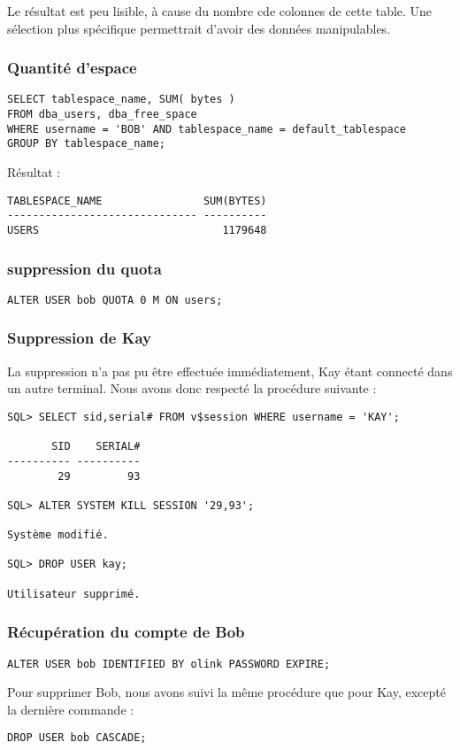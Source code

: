 Le résultat est peu lisible, à cause du nombre cde colonnes de cette table.
Une sélection plus spécifique permettrait d’avoir des données manipulables.

\subsubsection{Quantité d’espace}

\begin{verbatim}
SELECT tablespace_name, SUM( bytes )
FROM dba_users, dba_free_space
WHERE username = 'BOB' AND tablespace_name = default_tablespace
GROUP BY tablespace_name;
\end{verbatim}

Résultat :
\begin{verbatim}
TABLESPACE_NAME                SUM(BYTES)                                       
------------------------------ ----------                                       
USERS                             1179648 
\end{verbatim}

\subsubsection{suppression du quota}

\begin{verbatim}
ALTER USER bob QUOTA 0 M ON users;
\end{verbatim}

\subsubsection{Suppression de Kay}

La suppression n’a pas pu être effectuée immédiatement, Kay étant connecté
dans un autre terminal. Nous avons donc respecté la procédure suivante :

\begin{verbatim}
SQL> SELECT sid,serial# FROM v$session WHERE username = 'KAY';

       SID    SERIAL#                                                           
---------- ----------                                                           
        29         93   

SQL> ALTER SYSTEM KILL SESSION '29,93';

Système modifié.

SQL> DROP USER kay;

Utilisateur supprimé.                                                        
\end{verbatim}

\subsubsection{Récupération du compte de Bob}

\begin{verbatim}
ALTER USER bob IDENTIFIED BY olink PASSWORD EXPIRE;
\end{verbatim}

Pour supprimer Bob, nous avons suivi la même procédure que pour Kay, excepté la dernière commande :
\begin{verbatim}
DROP USER bob CASCADE;
\end{verbatim}
